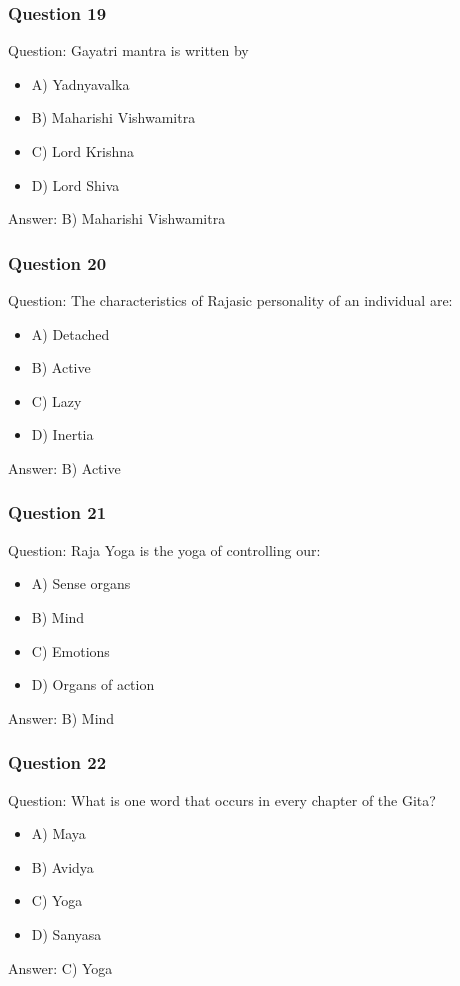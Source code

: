 \begin{frame}[fragile]\frametitle{Question 19}
Question: Gayatri mantra is written by
\begin{itemize}
\item A) Yadnyavalka
\item B) Maharishi Vishwamitra
\item C) Lord Krishna
\item D) Lord Shiva
\end{itemize}
Answer: B) Maharishi Vishwamitra
\end{frame}

\begin{frame}[fragile]\frametitle{Question 20}
Question: The characteristics of Rajasic personality of an individual are:
\begin{itemize}
\item A) Detached
\item B) Active
\item C) Lazy
\item D) Inertia
\end{itemize}
Answer: B) Active
\end{frame}

\begin{frame}[fragile]\frametitle{Question 21}
Question: Raja Yoga is the yoga of controlling our:
\begin{itemize}
\item A) Sense organs
\item B) Mind
\item C) Emotions
\item D) Organs of action
\end{itemize}
Answer: B) Mind
\end{frame}

\begin{frame}[fragile]\frametitle{Question 22}
Question: What is one word that occurs in every chapter of the Gita?
\begin{itemize}
\item A) Maya
\item B) Avidya
\item C) Yoga
\item D) Sanyasa
\end{itemize}
Answer: C) Yoga
\end{frame}

